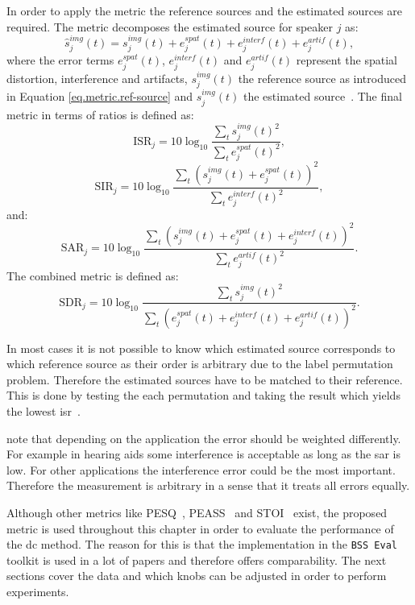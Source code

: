 In order to apply the metric the reference sources and the estimated sources are required. The metric decomposes the estimated source for speaker $j$ as:
\begin{equation}
	\hat{s}_{j}^{img}(t) = s_{j}^{img}(t) + e^{spat}_{j}(t) + e^{interf}_{j}(t) + e^{artif}_{j}(t),
\end{equation}
where the error terms $e^{spat}_{j}(t)$, $e^{interf}_{j}(t)$ and $e^{artif}_{j}(t)$ represent the spatial distortion, interference and artifacts, $s_{j}^{img}(t)$ the reference source as introduced in Equation \ref{eq.metric.ref-source} and $\hat{s}_{j}^{img}(t)$ the estimated source~\cite{Vincent2012}. The final metric in terms of ratios is defined as:
\begin{equation}
	\mathrm{ISR}_j=10\log_{10}{
	\frac{\sum_{t}s_{j}^{img}(t)^2}
	{\sum_{t}e_{j}^{spat}(t)^2}},
	\label{eq.isr}
\end{equation}
\begin{equation}
	\mathrm{SIR}_j=10\log_{10}{
	\frac{\sum_{t}(s_{j}^{img}(t)+e_{j}^{spat}(t))^2}
	{\sum_{t}e_{j}^{interf}(t)^2}},
	\label{eq.sir}
\end{equation}
and:
\begin{equation}
	\mathrm{SAR}_j=10\log_{10}{
	\frac{\sum_{t}(s_{j}^{img}(t)+e_{j}^{spat}(t)+e_{j}^{interf}(t))^2}
	{\sum_{t}e_{j}^{artif}(t)^2}}.
	\label{eq.sar}
\end{equation}
The combined metric is defined as:
\begin{equation}
	\mathrm{SDR}_j=10\log_{10}{
	\frac{\sum_{t}s_{j}^{img}(t)^2}
	{\sum_{t}(e_{j}^{spat}(t)+e_{j}^{interf}(t)+e_{j}^{artif}(t))^2}}.
	\label{eq.sdr}
\end{equation}

In most cases it is not possible to know which estimated source corresponds to which reference source as their order is arbitrary due to the label permutation problem. Therefore the estimated sources have to be matched to their reference. This is done by testing the each permutation and taking the result which yields the lowest \gls{isr}~\cite[p. 5]{Vincent2012}.

\textcite[p. 5]{Vincent2007} note that depending on the application the error should be weighted differently. For example in hearing aids some interference is acceptable as long as the \gls{sar} is low. For other applications the interference error could be the most important. Therefore the measurement is arbitrary in a sense that it treats all errors equally. 

Although other metrics like PESQ~\cite{Rix2001}, PEASS~\cite{Emiya2011} and STOI~\cite{Taal2010} exist,
the proposed metric is used throughout this chapter in order to evaluate the performance of the \gls{dc} method. The reason for this is that the implementation in the \texttt{BSS Eval} toolkit \cite{Fevotte2005} is used in a lot of papers and therefore offers comparability.
The next sections cover the data and which knobs can be adjusted in order to perform experiments.

